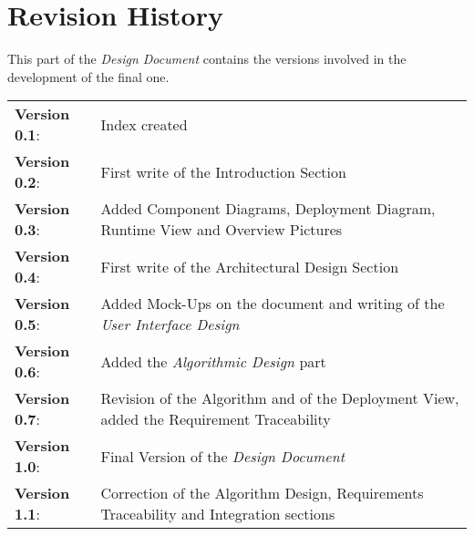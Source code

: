 \section{Revision History}

This part of the \emph{Design Document} contains the versions involved in the development of the final one.

\vspace{10pt}

\renewcommand{\arraystretch}{1.2}

\begin{tabular}{p{3cm} p{10cm}}

	\textbf{Version 0.1}:   & Index created \\
	\textbf{Version 0.2}:   & First write of the Introduction Section \\
	\textbf{Version 0.3}:   & Added Component Diagrams, Deployment Diagram, Runtime View and Overview Pictures\\
	\textbf{Version 0.4}:   & First write of the Architectural Design Section \\
	\textbf{Version 0.5}:   & Added Mock-Ups on the document and writing of the \emph{User Interface Design} \\
	\textbf{Version 0.6}:   & Added the \emph{Algorithmic Design} part \\
	\textbf{Version 0.7}:   & Revision of the Algorithm and of the Deployment View, added the Requirement                                         Traceability\\
	\large{\textbf{Version 1.0}}: & \large{Final Version of the \emph{Design Document}} \\
	\textbf{Version 1.1}:   & Correction of the Algorithm Design, Requirements Traceability and Integration sections \\
\end{tabular}